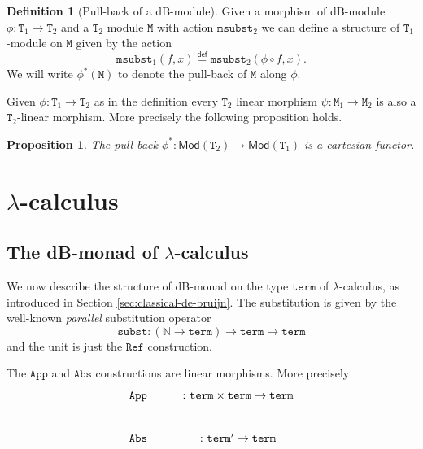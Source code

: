 \documentclass[a4paper,twoside,12pt]{article}
\newtheorem{proposition}{Proposition}
\theoremstyle{definition}
\newtheorem{definition}{Definition}
\theoremstyle{remark}
\theoremstyle{example}
\newcommand{\NN}{\mathbb{N}}
\newcommand{\TT}{\mathtt{T}}
\newcommand{\MM}{\mathtt{M}}
\newcommand{\msubst}{\mathtt{msubst}}
\begin{document}
\begin{definition}[Pull-back of a dB-module]
  Given a morphism of dB-module $\phi\colon \TT_1 \to \TT_2$ and a
  $\TT_2$ module $\MM$ with action $\msubst_2$ we can define a
  structure of $\TT_1$-module on $\MM$ given by the action
  \begin{equation*}
    \msubst_1(f,x) \stackrel{\mathsf{def}}{=} \msubst_2(\phi \circ f, x).
  \end{equation*}
  We will write $\phi^*(\MM)$ to denote the pull-back of $\MM$ along
  $\phi$.
\end{definition}

Given $\phi\colon \TT_1 \to \TT_2$ as in the definition every $\TT_2$
linear morphism $\psi\colon \MM_1 \to \MM_2$ is also a $\TT_2$-linear
morphism.  More precisely the following proposition holds.

\begin{proposition}
  \label{prop:pull-back-functor}
  The pull-back
  $\phi^* \colon \mathsf{Mod}(\TT_2) \to \mathsf{Mod}(\TT_1)$ is a
  cartesian functor.
\end{proposition}

\section{$\lambda$-calculus}
\label{sec:lambda-calculus}

\subsection{The dB-monad of $\lambda$-calculus}
\label{sec:db-monad-lambda}

We now describe the structure of dB-monad on the type $\mathtt{term}$
of $\lambda$-calculus, as introduced in Section
\ref{sec:classical-de-bruijn}.  The substitution is given by the
well-known \emph{parallel} substitution operator
\begin{equation*}
  \mathtt{subst}\colon (\NN \to \mathtt{term}) \to
  \mathtt{term} \to \mathtt{term}
\end{equation*}
and the unit is just the $\mathtt{Ref}$ construction.

The $\mathtt{App}$ and $\mathtt{Abs}$ constructions are linear
morphisms.  More precisely
\begin{equation*}
  \xymatrix{
    \mathtt{App} &\colon \mathtt{term} \times \mathtt{term} \to
                 \mathtt{term} \\
  \mathtt{Abs} &\colon \mathtt{term}' \to \mathtt{term}}
\end{equation*}
\end{document}

